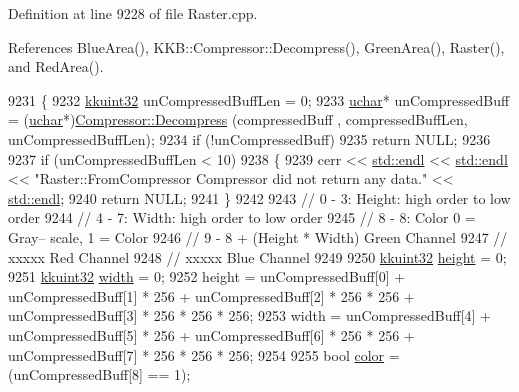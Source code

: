 Definition at line 9228 of file Raster.\+cpp.



References Blue\+Area(), K\+K\+B\+::\+Compressor\+::\+Decompress(), Green\+Area(), Raster(), and Red\+Area().


\begin{DoxyCode}
9231 \{
9232   \hyperlink{namespace_k_k_b_af8d832f05c54994a1cce25bd5743e19a}{kkuint32}  unCompressedBuffLen = 0;
9233   \hyperlink{namespace_k_k_b_ace9969169bf514f9ee6185186949cdf7}{uchar}*  unCompressedBuff = (\hyperlink{namespace_k_k_b_ace9969169bf514f9ee6185186949cdf7}{uchar}*)\hyperlink{class_k_k_b_1_1_compressor_a2a6621b98a88b60530ab344c25177b65}{Compressor::Decompress} (compressedBuff
      , compressedBuffLen, unCompressedBuffLen);
9234   \textcolor{keywordflow}{if}  (!unCompressedBuff)
9235     \textcolor{keywordflow}{return} NULL;
9236 
9237   \textcolor{keywordflow}{if}  (unCompressedBuffLen < 10)
9238   \{
9239     cerr << \hyperlink{namespace_k_k_b_ad1f50f65af6adc8fa9e6f62d007818a8}{std::endl} << \hyperlink{namespace_k_k_b_ad1f50f65af6adc8fa9e6f62d007818a8}{std::endl} << \textcolor{stringliteral}{"Raster::FromCompressor  Compressor did not return
       any data."}  << \hyperlink{namespace_k_k_b_ad1f50f65af6adc8fa9e6f62d007818a8}{std::endl};
9240     \textcolor{keywordflow}{return} NULL;
9241   \}
9242 
9243   \textcolor{comment}{// 0 - 3:    Height:  high order to low order}
9244   \textcolor{comment}{// 4 - 7:    Width:   high order to low order}
9245   \textcolor{comment}{// 8 - 8:    Color    0 = Gray--                                     scale,  1 = Color}
9246   \textcolor{comment}{// 9 - 8 + (Height * Width) Green Channel}
9247   \textcolor{comment}{// xxxxx                    Red  Channel}
9248   \textcolor{comment}{// xxxxx                    Blue Channel}
9249 
9250   \hyperlink{namespace_k_k_b_af8d832f05c54994a1cce25bd5743e19a}{kkuint32}  \hyperlink{class_k_k_b_1_1_raster_af39ff189de4fbb6de98392e187efafb7}{height} = 0;
9251   \hyperlink{namespace_k_k_b_af8d832f05c54994a1cce25bd5743e19a}{kkuint32}  \hyperlink{class_k_k_b_1_1_raster_ae0bcc103e191c3421d7692dc69ceb554}{width}  = 0;
9252   height = unCompressedBuff[0] + unCompressedBuff[1] * 256 + unCompressedBuff[2] * 256 * 256 + 
      unCompressedBuff[3] * 256 * 256 * 256;
9253   width  = unCompressedBuff[4] + unCompressedBuff[5] * 256 + unCompressedBuff[6] * 256 * 256 + 
      unCompressedBuff[7] * 256 * 256 * 256;
9254 
9255   \textcolor{keywordtype}{bool} \hyperlink{class_k_k_b_1_1_raster_a482384d89cc53fa4f36276307c746854}{color} = (unCompressedBuff[8] == 1);

\end{DoxyCode}
